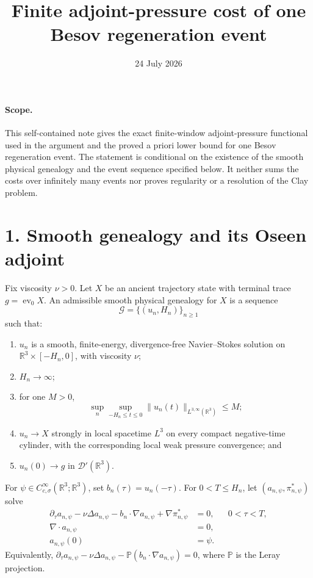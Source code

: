 \documentclass[11pt]{article}
\title{Finite adjoint-pressure cost of one Besov regeneration event}
\author{}
\date{24 July 2026}
\newcommand{\R}{\mathbb R}
\newcommand{\cG}{\mathcal G}
\newcommand{\ev}{\operatorname{ev}}
\newcommand{\weakLthree}{L^{3,\infty}}
\begin{document}
\maketitle

\paragraph{Scope.}
This self-contained note gives the exact finite-window
adjoint-pressure functional used in the argument and the proved
a priori lower bound for one Besov regeneration event.  The statement is
conditional on the existence of the smooth physical genealogy and the
event sequence specified below.  It neither sums the costs over infinitely
many events nor proves regularity or a resolution of the Clay problem.

\section*{1. Smooth genealogy and its Oseen adjoint}

Fix viscosity \(\nu>0\).  Let \(X\) be an ancient trajectory state with
terminal trace \(g=\ev_0X\).  An admissible smooth physical genealogy for
\(X\) is a sequence
\[
  \cG=\{(u_n,H_n)\}_{n\ge1}
\]
such that:
\begin{enumerate}
  \item \(u_n\) is a smooth, finite-energy, divergence-free
        Navier--Stokes solution on
        \(\R^3\times[-H_n,0]\), with viscosity \(\nu\);
  \item \(H_n\to\infty\);
  \item for one \(M>0\),
        \begin{equation}
          \sup_n\sup_{-H_n\le t\le0}
          \|u_n(t)\|_{\weakLthree(\R^3)}
          \le M;
          \label{eq:weak-L3}
        \end{equation}
  \item \(u_n\to X\) strongly in local spacetime \(L^3\) on every
        compact negative-time cylinder, with the corresponding local weak
        pressure convergence; and
  \item \(u_n(0)\to g\) in \(\mathcal D'(\R^3)\).
\end{enumerate}

For \(\psi\in C^\infty_{c,\sigma}(\R^3;\R^3)\), set
\(b_n(\tau)=u_n(-\tau)\).  For \(0<T\le H_n\), let
\((a_{n,\psi},\pi^*_{n,\psi})\) solve
\begin{equation}
  \boxed{
  \begin{aligned}
    \partial_\tau a_{n,\psi}
      -\nu\Delta a_{n,\psi}
      -b_n\cdot\nabla a_{n,\psi}
      +\nabla\pi^*_{n,\psi}&=0,
      &&0<\tau<T,\\
    \nabla\cdot a_{n,\psi}&=0,\\
    a_{n,\psi}(0)&=\psi .
  \end{aligned}}
  \label{eq:adjoint}
\end{equation}
Equivalently,
\(\partial_\tau a_{n,\psi}-\nu\Delta a_{n,\psi}
-\mathbb P(b_n\cdot\nabla a_{n,\psi})=0\), where
\(\mathbb P\) is the Leray projection.
\end{document}
